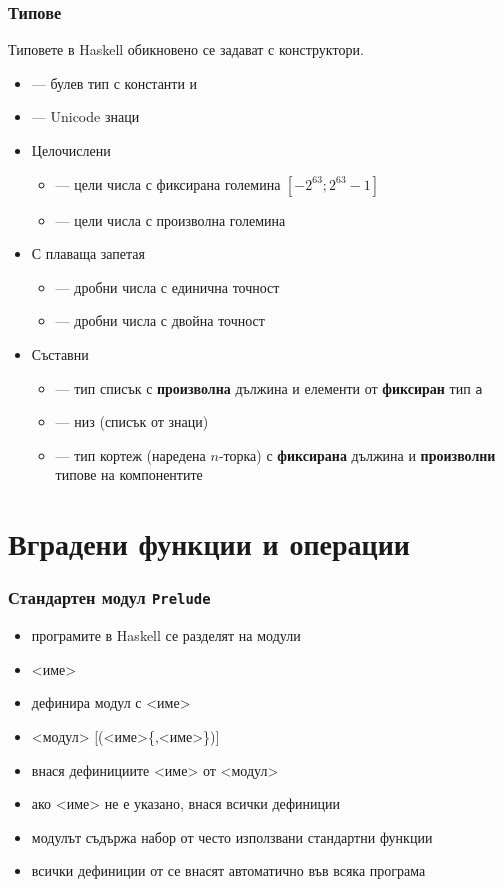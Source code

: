 \documentclass[alsotrans,beameroptions={aspectratio=169}]{beamerswitch}
\begin{document}
\begin{frame}
  \frametitle{Типове}

  Типовете в Haskell обикновено се задават с конструктори. \pause
  \begin{itemize}[<+->]
  \item {} --- булев тип с константи  и 
  \item {} --- Unicode знаци
  \item Целочислени
    \begin{itemize}
    \item {} --- цели числа с фиксирана големина $[-2^{63}; 2^{63}-1]$
    \item {} --- цели числа с произволна големина
    \end{itemize}
  \item С плаваща запетая
    \begin{itemize}
    \item {} --- дробни числа с единична точност
    \item {} --- дробни числа с двойна точност
    \end{itemize}
  \item Съставни
    \begin{itemize}
    \item \lst{[a]} --- тип списък с \textbf{произволна} дължина и
      елементи от \textbf{фиксиран} тип \tt a
    \item {} --- низ (списък от знаци)
    \item {} --- тип кортеж (наредена $n$-торка) с
      \textbf{фиксирана} дължина и \textbf{произволни} типове на
      компонентите
    \end{itemize}
  \end{itemize}
\end{frame}

\section{Вградени функции и операции}

\begin{frame}[fragile]
  \frametitle{Стандартен модул \tt{Prelude}}

  \begin{itemize}[<+->]
  \item програмите в Haskell се разделят на модули
  \item {} <име> 
  \item дефинира модул с <име>
  \item {} <модул> [\tta(<име>\{,<име>\}\tta)]
  \item внася дефинициите <име> от <модул>
  \item ако <име> не е указано, внася всички дефиниции
  \item модулът  съдържа набор от често използвани стандартни функции
  \item всички дефиниции от  се внасят автоматично във всяка програма
  \end{itemize}
\end{frame}
\end{document}
